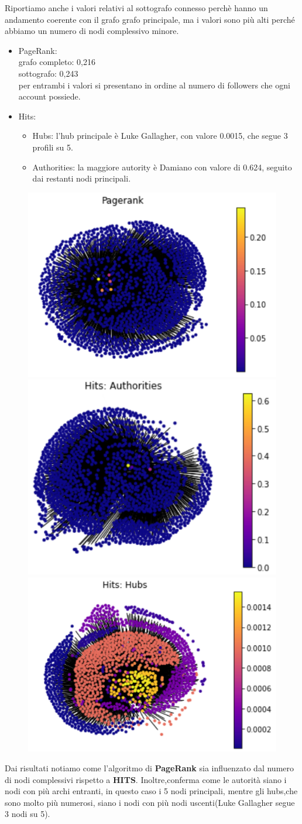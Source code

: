 \documentclass[a4paper,11pt]{report}
\begin{document}
	Riportiamo anche i valori relativi al sottografo connesso perchè hanno un andamento coerente con il grafo grafo principale, ma i valori sono più alti perché abbiamo un numero di nodi complessivo minore.
		\begin{itemize}
			\item PageRank:\\ grafo completo: 0,216\\  
			sottografo: 0,243 \\per entrambi i valori si presentano in ordine al numero di followers che ogni account possiede.
			\item Hits: 
				\begin{itemize}
					\item Hubs: l'hub principale è Luke Gallagher, con valore 0.0015, che segue 3 profili su 5.
					\item Authorities: la maggiore autority è Damiano con valore di 0.624, seguito dai restanti nodi principali.
			\end{itemize}
		\end{itemize}
		\begin{figure}[h]
		\includegraphics[width=.32\textwidth]{pagerank}\hfill
		\includegraphics[width=.32\textwidth]{authorities}\hfill
		\includegraphics[width=.32\textwidth]{hubs}
		\end{figure}
	Dai risultati notiamo come l'algoritmo di \textbf{PageRank} sia influenzato dal numero di nodi complessivi rispetto a \textbf{HITS}. Inoltre,conferma come le autorità siano i nodi con più archi entranti, in questo caso i 5 nodi principali, mentre gli hubs,che sono molto più numerosi, siano i nodi con più nodi uscenti(Luke Gallagher segue 3 nodi su 5).
\end{document}
